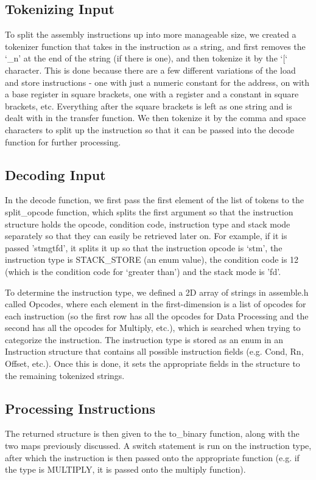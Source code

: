 \documentclass[a4paper]{article}
\begin{document}
\subsection{Tokenizing Input}
To split the assembly instructions up into more manageable size, we created a tokenizer function that takes in the instruction as a string, and first removes the ‘\_n’ at the end of the string (if there is one), and then tokenize it by the ‘[‘ character. This is done because there are a few different variations of the load and store instructions - one with just a numeric constant for the address, on with a base register in square brackets, one with a register and a constant in square brackets, etc. Everything after the square brackets is left as one string and is dealt with in the transfer function. We then tokenize it by the comma and space characters to split up the instruction so that it can be passed into the decode function for further processing.
\subsection{Decoding Input}
In the decode function, we first pass the first element of the list of tokens to the split\_opcode function, which splits the first argument so that the instruction structure holds the opcode, condition code, instruction type and stack mode separately so that they can easily be retrieved later on. For example, if it is passed 'stmgtfd’, it splits it up so that the instruction opcode is ‘stm’, the instruction type is STACK\_STORE (an enum value), the condition code is 12 (which is the condition code for ‘greater than’) and the stack mode is 'fd’.

To determine the instruction type, we defined a 2D array of strings in assemble.h called Opcodes, where each element in the first-dimension is a list of opcodes for each instruction (so the first row has all the opcodes for Data Processing and the second has all the opcodes for Multiply, etc.), which is searched when trying to categorize the instruction. The instruction type is stored as an enum in an Instruction structure that contains all possible instruction fields (e.g. Cond, Rn, Offset, etc.). Once this is done, it sets the appropriate fields in the structure to the remaining tokenized strings.
\subsection{Processing Instructions}
The returned structure is then given to the to\_binary function, along with the two maps previously discussed. A switch statement is run on the instruction type, after which the instruction is then passed onto the appropriate function (e.g. if the type is MULTIPLY, it is passed onto the multiply function).
\end{document}
